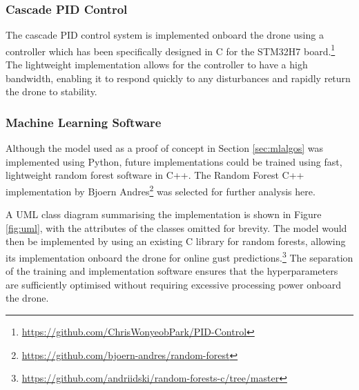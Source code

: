 \subsubsection{Cascade \gls{PID} Control}

The cascade \gls{PID} control system is implemented onboard the drone using a controller which has been specifically designed in C for the STM32H7 board.\footnote{\url{https://github.com/ChrisWonyeobPark/PID-Control}} The lightweight implementation allows for the controller to have a high bandwidth, enabling it to respond quickly to any disturbances and rapidly return the drone to stability.

\subsubsection{Machine Learning Software}

Although the model used as a proof of concept in Section \ref{sec:mlalgos} was implemented using Python, future implementations could be trained using fast, lightweight random forest software in C++. The Random Forest C++ implementation by Bjoern Andres\footnote{\url{https://github.com/bjoern-andres/random-forest}} was selected for further analysis here. 

A \gls{UML} class diagram summarising the implementation is shown in Figure \ref{fig:uml}, with the attributes of the classes omitted for brevity. The model would then be implemented by using an existing C library for random forests, allowing its implementation onboard the drone for online gust predictions.\footnote{\url{https://github.com/andriidski/random-forests-c/tree/master}} The separation of the training and implementation software ensures that the hyperparameters are sufficiently optimised without requiring excessive processing power onboard the drone.

